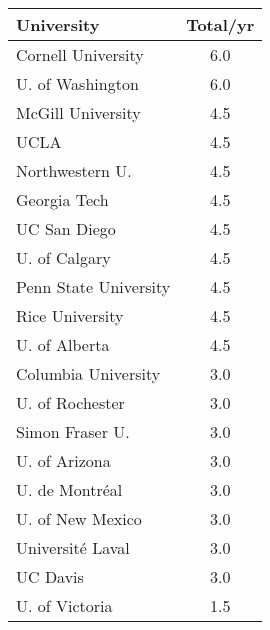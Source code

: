 \documentclass[aspectratio=169]{beamer}
\begin{document}
\begin{frame}[fragile]
\begin{columns}[T]
\begin{column}{0.5\textwidth}
\begin{tabularx}{\linewidth}{lS[table-format=1.1]}
                \toprule
                \textbf{University} & {\textbf{Total/yr}} \\
                \midrule
                Cornell University & 6.0 \\
                U. of Washington & 6.0 \\
                McGill University & 4.5 \\
                UCLA & 4.5 \\
                Northwestern U. & 4.5 \\
                Georgia Tech & 4.5 \\
                UC San Diego & 4.5 \\
                U. of Calgary & 4.5 \\
                Penn State University & 4.5 \\
                Rice University & 4.5 \\
                U. of Alberta & 4.5 \\
                Columbia University & 3.0 \\
                U. of Rochester & 3.0 \\
                Simon Fraser U. & 3.0 \\
                U. of Arizona & 3.0 \\
                U. de Montréal & 3.0 \\
                U. of New Mexico & 3.0 \\
                Université Laval & 3.0 \\
                UC Davis & 3.0 \\
                U. of Victoria & 1.5 \\
                \bottomrule
            \end{tabularx}
        \end{column}
    \end{columns}
\end{frame}
\end{document}
